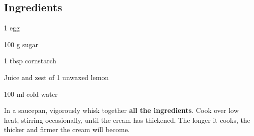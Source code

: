 \newpage
{}

\subsection*{Ingredients}
\begin{ingredients}
	\item 1 egg
	\item 100 g sugar
	\item 1 tbsp cornstarch
	\item Juice and zest of 1 unwaxed lemon
	\item 100 ml cold water
\end{ingredients}

\medskip 

In a saucepan, vigorously whisk together \textbf{all the ingredients}.
Cook over low heat, stirring occasionally, until the cream has thickened.
The longer it cooks, the thicker and firmer the cream will become.

\vspace*{0.75 cm}

\begin{recipeblock}
	
\end{recipeblock}